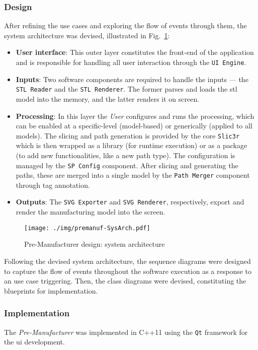\subsubsection{Design}%
\label{sec:design-premanuf}
After refining the use cases and exploring the flow of events through them, the
system architecture was devised, illustrated in Fig.~\ref{fig:premanuf-sysArch}:
\begin{itemize}
\item \textbf{User interface}: This outer layer constitutes the front-end of the
  application and is responsible for handling all user interaction through the
  \texttt{UI Engine}.
\item \textbf{Inputs}: Two software components are required to handle the
  inputs --- the \texttt{STL Reader} and the \texttt{STL Renderer}. The former
  parses and loads the \gls{stl} model into the memory, and the latter renders
  it on screen.
\item \textbf{Processing}: In this layer the \emph{User} configures and runs the
processing, which can be enabled at a specific-level (model-based) or
generically (applied to all models). The slicing and path generation is provided by the core
\texttt{Slic3r} which is then wrapped as a library (for runtime execution) or as
a package (to add new functionalities, like a new path type). The configuration
is managed by the \texttt{SP Config} component. After slicing and generating the
paths, these are merged into a single model by the \texttt{Path Merger}
component through tag annotation.
\item \textbf{Outputs}: The \texttt{SVG Exporter} and \texttt{SVG Renderer},
  respectively, export and render the manufacturing model into the screen.
\end{itemize}

\begin{figure}[!hbt]
  \centering
    \texttt{[image: ./img/premanuf-SysArch.pdf]}
  \caption{Pre-Manufacturer design: system architecture}\label{fig:premanuf-sysArch}
\end{figure}

Following the devised system architecture, the sequence diagrams were designed to
capture the flow of events throughout the software execution as a response to
an use case triggering. Then, the class diagrams were devised, constituting the
blueprints for implementation.

\subsubsection{Implementation}%
\label{sec:implementation-premanuf}
The \emph{Pre-Manufacturer} was implemented in C++11 using the \texttt{Qt}
framework for the \gls{ui} development.

